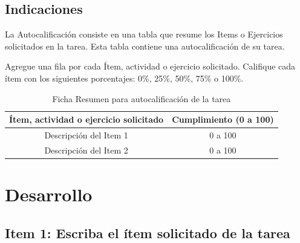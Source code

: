 \documentclass{article}
\begin{document}
\subsection{Indicaciones}
La Autocalificación consiste en una tabla que resume los Items o Ejercicios solicitados en la tarea. Esta tabla contiene una autocalificación de su tarea. 

Agregue una fila por cada Ítem, actividad o ejercicio solicitado. Califique cada ítem con los siguientes porcentajes: 0\%, 25\%, 50\%, 75\% o 100\%.

\begin{table}[h]
    \caption{Ficha Resumen para autocalificación de la tarea}

    \centering

    \begin{tabular}{|c|c|}
        \hline

            \textbf{Ítem, actividad o ejercicio solicitado} & \textbf{ Cumplimiento (0 a 100)}\\
        \hline
            Descripción del Item 1 & 0 a 100 \\
        \hline
            Descripción del Item 2 & 0 a 100 \\
        \hline
    \end{tabular}

    \label{tab:my_label}

\end{table}







\section{Desarrollo}


\subsection{Item 1: Escriba el ítem solicitado de la tarea}
\end{document}
